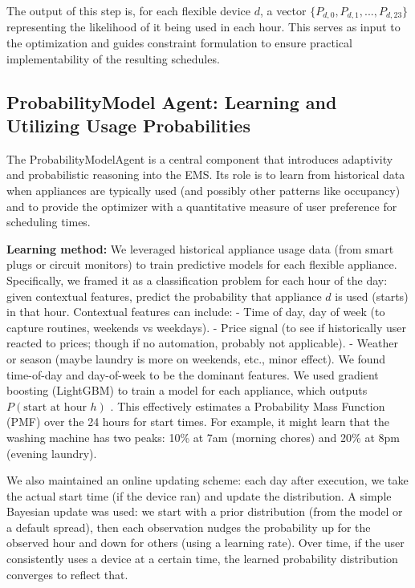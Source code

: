 \documentclass[12pt,a4paper]{article}
\begin{document}
The output of this step is, for each flexible device $d$, a vector $\{P_{d,0}, P_{d,1}, ..., P_{d,23}\}$ representing the likelihood of it being used in each hour. This serves as input to the optimization and guides constraint formulation to ensure practical implementability of the resulting schedules.

\subsection{ProbabilityModel Agent: Learning and Utilizing Usage Probabilities}
The ProbabilityModelAgent is a central component that introduces adaptivity and probabilistic reasoning into the EMS. Its role is to learn from historical data when appliances are typically used (and possibly other patterns like occupancy) and to provide the optimizer with a quantitative measure of user preference for scheduling times.

\textbf{Learning method:} We leveraged historical appliance usage data (from smart plugs or circuit monitors) to train predictive models for each flexible appliance. Specifically, we framed it as a classification problem for each hour of the day: given contextual features, predict the probability that appliance $d$ is used (starts) in that hour. Contextual features can include:
- Time of day, day of week (to capture routines, weekends vs weekdays).
- Price signal (to see if historically user reacted to prices; though if no automation, probably not applicable).
- Weather or season (maybe laundry is more on weekends, etc., minor effect).
We found time-of-day and day-of-week to be the dominant features. We used gradient boosting (LightGBM) to train a model for each appliance, which outputs $P(\text{start at hour } h)$ \cite{Yoshida2018, Mahmoudi2020}. This effectively estimates a Probability Mass Function (PMF) over the 24 hours for start times. For example, it might learn that the washing machine has two peaks: 10\% at 7am (morning chores) and 20\% at 8pm (evening laundry).

We also maintained an online updating scheme: each day after execution, we take the actual start time (if the device ran) and update the distribution. A simple Bayesian update was used: we start with a prior distribution (from the model or a default spread), then each observation nudges the probability up for the observed hour and down for others (using a learning rate). Over time, if the user consistently uses a device at a certain time, the learned probability distribution converges to reflect that.
\end{document}
